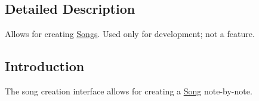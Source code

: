 \subsection{Detailed Description}
Allows for creating \hyperlink{class_song}{Songs}. Used only for development; not a feature. 

\hypertarget{group___doc_s_c_DocSCIntro}{}\subsection{Introduction}\label{group___doc_s_c_DocSCIntro}
The song creation interface allows for creating a \hyperlink{class_song}{Song} note-\/by-\/note.

 